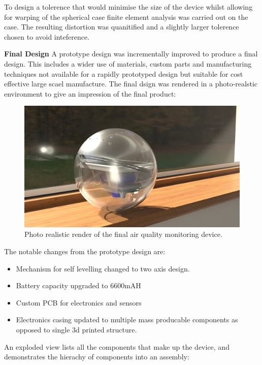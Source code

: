 To design a tolerence that would minimise the size of the device whilst allowing for warping of the spherical case finite element analysis was carried out on the case. The resulting distortion was quanitified and a slightly larger tolerence chosen to avoid inteference.



\textbf{Final Design}
A prototype design was incrementally improved to produce a final design. This includes a wider use of materials, custom parts and manufacturing techniques not available for a rapidly prototyped design but suitable for cost effective large scael manufacture. The final dsign was rendered in a photo-realstic environment to give an impression of the final product:

\begin{figure}[H]
\centering
\includegraphics[width=0.8\linewidth]{Engineering_hardware/Engineering_hardware_Figures/0300.png}
\caption{Photo realistic render of the final air quality monitoring device. }
\label{fig:15cm_shell_loading}
\end{figure}
The notable changes from the prototype design are:
\begin{itemize}
\item Mechanism for self levelling changed to two axis design.
\item Battery capacity upgraded to 6600mAH 
\item Custom PCB for electronics and sensors
\item Electronics casing updated to multiple mass producable components as opposed to single 3d printed structure.
\end{itemize}
An exploded view lists all the components that make up the device, and demonstrates the hierachy of components into an assembly:

